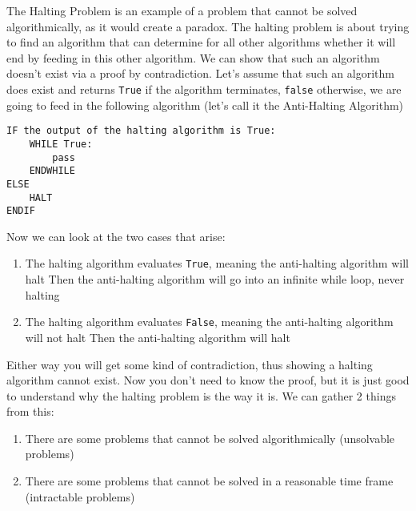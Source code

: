   \noindent
  The Halting Problem is an example of a problem that cannot be solved algorithmically, as it would create a paradox. The halting problem is about trying to find an algorithm that can determine for all other algorithms whether it will end by feeding in this other algorithm. We can show that such an algorithm doesn't exist via a proof by contradiction. Let's assume that such an algorithm does exist and returns \verb|True| if the algorithm terminates, \verb|false| otherwise, we are going to feed in the following algorithm (let's call it the Anti-Halting Algorithm)
  
  \begin{verbatim}
IF the output of the halting algorithm is True:
    WHILE True:
        pass
    ENDWHILE
ELSE
    HALT
ENDIF
  \end{verbatim}Now we can look at the two cases that arise:
  \begin{enumerate}
  	\item The halting algorithm evaluates \verb|True|, meaning the anti-halting algorithm will halt
	  	\subitem Then the anti-halting algorithm will go into an infinite while loop, never halting
	\item The halting algorithm evaluates \verb|False|, meaning the anti-halting algorithm will not halt
		\subitem Then the anti-halting algorithm will halt
  \end{enumerate}
  
  Either way you will get some kind of contradiction, thus showing a halting algorithm cannot exist. Now you don't need to know the proof, but it is just good to understand why the halting problem is the way it is. We can gather 2 things from this:
  \begin{enumerate}
  	\item There are some problems that cannot be solved algorithmically (unsolvable problems)
  	\item There are some problems that cannot be solved in a reasonable time frame (intractable problems)
  \end{enumerate}

